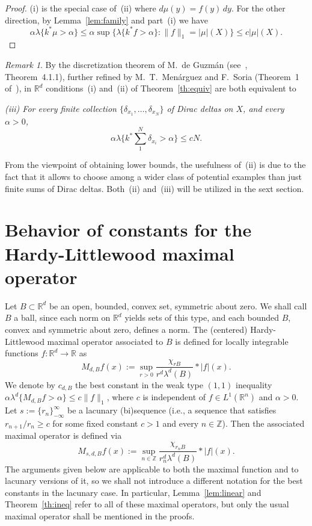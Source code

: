 \documentclass[12pt,a4paper]{amsart}
\theoremstyle{plain}
\theoremstyle{remark}
\newtheorem{rem}{Remark}
\begin{document}
\begin{proof}
(i) is the special case of~(ii) where $d\mu(y) = f(y)\,dy$.
For the other direction, by Lemma~\ref{lem:family} and part~(i) we have
\[
    \alpha \lambda \{k^* \mu > \alpha\}
    \le \alpha \sup \{ \lambda \{k^*f > \alpha\} : \|f\|_1 = |\mu|(X) \}
    \le c |\mu|(X).
\]
\end{proof}

\begin{rem}
By the discretization theorem of M.~de Guzm\'an
(see~\cite{Guz}, Theorem~4.1.1), further refined by
M.~T.~Men\'arguez and F.~Soria (Theorem~1 of~\cite{MeSo}), in
$\mathbb{R}^d$ conditions~(i) and~(ii) of Theorem~\ref{th:equiv} are
both equivalent to

\textit{
(iii) For every finite collection $\{\delta_{x_1}, \dots , \delta_{x_N}\}$
of Dirac deltas on $X$, and every $\alpha > 0$,
\[
    \alpha \lambda \big\{ k^* \sum_1^N \delta_{x_i} > \alpha \big\} \le c N.
\]
}

From the viewpoint of obtaining lower
bounds, the usefulness of~(ii) is due to the fact that it allows to choose
among a wider class of potential examples than just finite sums of Dirac deltas.
Both~(ii) and~(iii) will be utilized in the sext section.
\end{rem}


\section{Behavior of constants for the Hardy-Littlewood maximal operator}
\label{sec:constants}

Let $B \subset \mathbb{R}^d$ be an open, bounded, convex set,
symmetric about zero.
We shall call $B$ a ball, since each norm on $\mathbb{R}^d$ yields sets of this
type, and each bounded $B$, convex and symmetric about zero, defines a norm.
The (centered) Hardy-Littlewood maximal operator associated to $B$
is defined for locally integrable
functions $f \colon \mathbb{R}^d \to \mathbb{R}$ as
\[
    M_{d,B} f(x) := \sup_{r > 0}
      \frac{\chi_{rB}}{r^d \lambda^d (B)}*|f| (x).
\]
We denote by $c_{d,B}$ the best constant in the weak type $(1,1)$
inequality
$\alpha \lambda^d \{ M_{d,B} f > \alpha \} \le c \|f\|_1$,
where $c$ is independent of
$f \in L^1(\mathbb{R}^n)$ and $\alpha > 0$. Let $s :=\{r_n\}_{-\infty}^\infty$
be a lacunary (bi)sequence (i.e., a sequence
that satisfies $r_{n+1}/r_n \ge c$ for some fixed constant
$c > 1$ and every $n \in \mathbb{Z}$). Then the associated maximal operator
is defined via
\[
    M_{s,d,B} f(x) := \sup_{n \in \mathbb{Z}}
    \frac{\chi_{r_n B}}{r_n^d \lambda^d(B)}*|f| (x).
\]
The arguments given below are applicable to both the maximal function
and to lacunary versions of it, so we shall not introduce
a different notation for the best constants in the lacunary case.
In particular, Lemma~\ref{lem:linear} and Theorem~\ref{th:ineq}
refer to all of these maximal operators, but only the usual maximal operator
shall be mentioned in the proofs.
\end{document}
